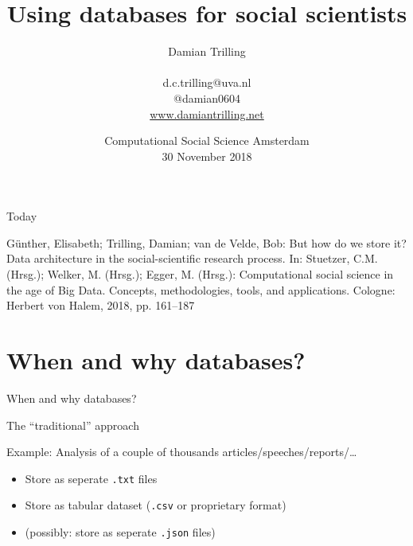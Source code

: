 \documentclass{beamer}
\begin{document}
\title{Using databases for social scientists}
\author[Damian Trilling]{Damian Trilling \\ ~ \\ \footnotesize{d.c.trilling@uva.nl \\@damian0604} \\ \url{www.damiantrilling.net}}
\date[30-11-2018]{Computational Social Science Amsterdam\\ 30 November 2018}


\begin{frame}{}
\titlepage
\end{frame}

\begin{frame}{Today}
\tableofcontents
\end{frame}

\begin{frame}[plain]
G\"unther, Elisabeth; Trilling, Damian; van de Velde, Bob: But how do we store it?
Data architecture in the social-scientific research process. In: Stuetzer, C.M. (Hrsg.);
Welker, M. (Hrsg.); Egger, M. (Hrsg.): Computational social science in the age of
Big Data. Concepts, methodologies, tools, and applications. Cologne: Herbert von Halem, 2018, pp. 161–187	

\end{frame}


\section{When and why databases?}


\begin{frame}[plain]
	When and why databases?
\end{frame}


\begin{frame}{The ``traditional'' approach}
	\begin{block}{Example: Analysis of a couple of thousands articles/speeches/reports/\ldots}
		\begin{itemize}
			\item<2-> Store as seperate \texttt{.txt} files
		\end{itemize}
		\begin{itemize}
			\item<3-> Store as tabular dataset (\texttt{.csv} or proprietary format)
			\item<4-> (possibly: store as seperate \texttt{.json} files)
		\end{itemize}
	\end{block}
\end{frame}
\end{document}
